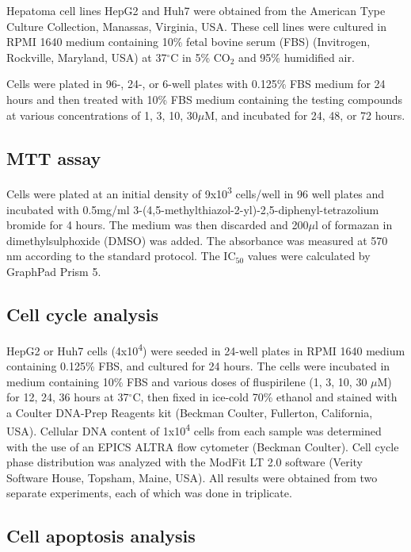 \documentclass[10pt,letterpaper]{article}
\begin{document}
Hepatoma cell lines HepG2 and Huh7 were obtained from the American Type Culture Collection, Manassas, Virginia, USA. These cell lines were cultured in RPMI 1640 medium containing 10\% fetal bovine serum (FBS) (Invitrogen, Rockville, Maryland, USA) at 37$^\circ$C in 5\% CO$_2$ and 95\% humidified air.

Cells were plated in 96-, 24-, or 6-well plates with 0.125\% FBS medium for 24 hours and then treated with 10\% FBS medium containing the testing compounds at various concentrations of 1, 3, 10, 30$\mu$M, and incubated for 24, 48, or 72 hours.

\subsection*{MTT assay}

Cells were plated at an initial density of 9x10\textsuperscript{3} cells/well in 96 well plates and incubated with 0.5mg/ml 3-(4,5-methylthiazol-2-yl)-2,5-diphenyl-tetrazolium bromide for 4 hours. The medium was then discarded and 200$\mu$l of formazan in dimethylsulphoxide (DMSO) was added. The absorbance was measured at 570 nm according to the standard protocol. The IC$_{50}$ values were calculated by GraphPad Prism 5.

\subsection*{Cell cycle analysis}

HepG2 or Huh7 cells (4x10\textsuperscript{4}) were seeded in 24-well plates in RPMI 1640 medium containing 0.125\% FBS, and cultured for 24 hours. The cells were incubated in medium containing 10\% FBS and various doses of fluspirilene (1, 3, 10, 30 $\mu$M) for 12, 24, 36 hours at 37$^\circ$C, then fixed in ice-cold 70\% ethanol and stained with a Coulter DNA-Prep Reagents kit (Beckman Coulter, Fullerton, California, USA). Cellular DNA content of 1x10\textsuperscript{4} cells from each sample was determined with the use of an EPICS ALTRA flow cytometer (Beckman Coulter). Cell cycle phase distribution was analyzed with the ModFit LT 2.0 software (Verity Software House, Topsham, Maine, USA). All results were obtained from two separate experiments, each of which was done in triplicate.

\subsection*{Cell apoptosis analysis}
\end{document}
